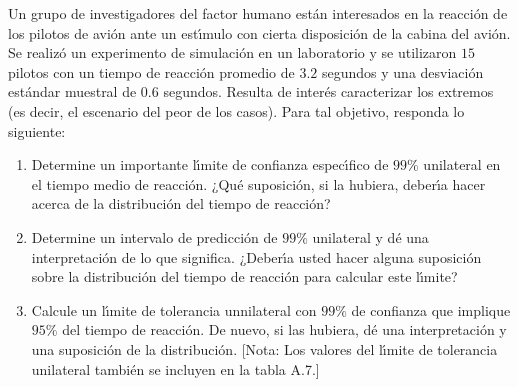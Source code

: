 \begin{enunciado}
 Un grupo de investigadores del factor humano est\'an interesados en la reacci\'on de los pilotos de avi\'on ante un est\'{\i}mulo con cierta disposici\'on de la cabina del avi\'on. Se realiz\'o un experimento de simulaci\'on en un laboratorio y se utilizaron $15$ pilotos con un tiempo de reacci\'on promedio de $3.2$ segundos y una desviaci\'on est\'andar muestral de $0.6$ segundos. Resulta de inter\'es caracterizar los extremos (es decir, el escenario del peor de los casos). Para tal objetivo, responda lo siguiente:
 \begin{enumerate}
  \item Determine un importante l\'{\i}mite de confianza espec\'{\i}fico de $99\%$ unilateral en el tiempo medio de reacci\'on. ¿Qu\'e suposici\'on, si la hubiera, deber\'{\i}a hacer acerca de la distribuci\'on del tiempo de reacci\'on?
  
  \item Determine un intervalo de predicci\'on de $99\%$ unilateral y d\'e una interpretaci\'on de lo que significa. ¿Deber\'{\i}a usted hacer alguna suposici\'on sobre la distribuci\'on del tiempo de reacci\'on para calcular este l\'{\i}mite?
  
  \item Calcule un l\'{\i}mite de tolerancia unnilateral con $99\%$ de confianza que implique $95\%$ del tiempo de reacci\'on. De nuevo, si las hubiera, d\'e una interpretaci\'on y una suposici\'on de la distribuci\'on. [Nota: Los valores del l\'{\i}mite de tolerancia unilateral tambi\'en se incluyen en la tabla A.7.]
 \end{enumerate}
\end{enunciado}

